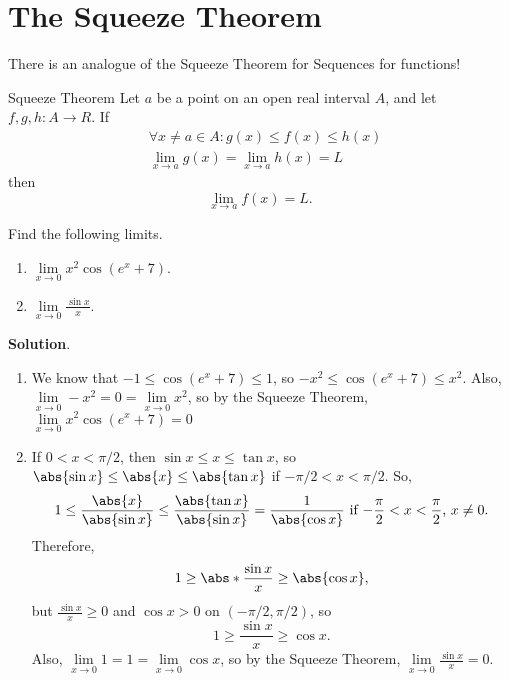 \section{The Squeeze Theorem}
There is an analogue of the Squeeze Theorem for Sequences for functions!
\begin{Theorem}{Squeeze Theorem}{}
    Let $ a $ be a point on an open real interval $ A $, and let $ f,g,h\colon A\to R $. If
    \begin{align*}
         & \forall x\ne a\in A:g(x)\le f(x)\le h(x)                      \\
         & \lim\limits_{{x} \to {a}}g(x)=\lim\limits_{{x} \to {a}}h(x)=L
    \end{align*}
    then
    \[ \lim\limits_{{x} \to {a}}f(x)=L. \]
\end{Theorem}
\begin{Example}{}{}
    Find the following limits.
    \begin{enumerate}[(1)]
        \item $ \lim\limits_{{x} \to {0}}x^2\cos(e^x+7) $.
        \item $ \lim\limits_{{x} \to {0}}\frac{\sin x}{x} $.
    \end{enumerate}
    \tcblower{}
    \textbf{Solution}.
    \begin{enumerate}[(1)]
        \item We know that $ -1\le \cos(e^x+7)\le 1 $, so $ -x^2\le \cos(e^x+7)\le x^2 $. Also,
              $\lim\limits_{{x} \to {0}}-x^2=0=\lim\limits_{{x} \to {0}}x^2$, so by the Squeeze Theorem,
              $ \lim\limits_{{x} \to {0}}x^2\cos(e^x+7)=0 $
        \item If $ 0<x<\pi/2 $, then $ \sin x\le x\le \tan x $, so $ \abs{\sin x}\le \abs{x}\le \abs{\tan x} $ if $ -\pi/2<x<\pi/2 $.
              So,
              \[ 1\le \frac{\abs{x}}{\abs{\sin x}}\le \frac{\abs{\tan x}}{\abs{\sin x}}=\frac{1}{\abs{\cos x}}\text{ if $ -\frac{\pi}{2}<x<\frac{\pi}{2} $, $x\ne 0$}. \]
              Therefore,
              \[ 1\ge \abs*{\frac{\sin x}{x}}\ge \abs{\cos x}, \]
              but $ \displaystyle \frac{\sin x}{x}\ge 0 $ and $ \cos x>0 $ on $ (-\pi/2,\pi/2) $, so
              \[ 1\ge \frac{\sin x}{x}\ge \cos x. \]
              Also, $ \lim\limits_{{x} \to {0}}1=1=\lim\limits_{{x} \to {0}}\cos x $, so by the Squeeze Theorem,
              $ \lim\limits_{{x} \to {0}}\frac{\sin x}{x}=0 $.
    \end{enumerate}
\end{Example}